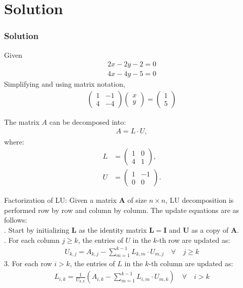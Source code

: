 \documentclass{beamer}
\providecommand{\brak}[1]{\ensuremath{\left(#1\right)}}
\theoremstyle{remark}
\newcommand{\myvec}[1]{\ensuremath{\begin{pmatrix}#1\end{pmatrix}}}
\numberwithin{equation}{section}
\begin{document}
\section{Solution}
\begin{frame}
\frametitle{Solution}
Given
\begin{align}
    2x-2y-2=0\\
    4x-4y-5 = 0
\end{align}
Simplifying and using matrix notation,
\begin{align}
    \myvec{
        1 & -1\\
        4 & -4
    } \myvec{x \\ y}= \myvec{ 1 \\ 5}
\end{align}
\end{frame}
\begin{frame}
The matrix $A$ can be decomposed into:
\begin{align}
    A = L \cdot U,
\end{align}
where:
\begin{align}
    L &= \myvec{1 & 0 \\ 4 & 1}, \\
    U &= \myvec{1 & -1 \\ 0 & 0}.
\end{align}
\newline
\end{frame}
\begin{frame}
Factorization of LU:\newline
Given a matrix $ \mathbf{A} $ of size $ n \times n $, LU decomposition is performed row by row and column by column. The update equations are as follows: \\ 
. Start by initializing $ \mathbf{L} $ as the identity matrix $ \mathbf{L} = \mathbf{I} $ and $ \mathbf{U} $ as a copy of $ \mathbf{A} $.\\
. For each column $ j \geq k $, the entries of $ U $ in the $ k $-th row are updated as:
\begin{align}
U_{k,j} = A_{k,j} - \sum_{m=1}^{k-1} L_{k,m} \cdot U_{m,j}\quad \forall \quad j \geq k
\end{align}
3. For each row $ i > k $, the entries of $ L $ in the $ k $-th column are updated as:
\begin{align}
L_{i,k} = \frac{1}{U_{k,k}} \brak{ A_{i,k} - \sum_{m=1}^{k-1} L_{i,m} \cdot U_{m,k}} \quad \forall \quad i > k
\end{align}
\end{frame}
\end{document}
